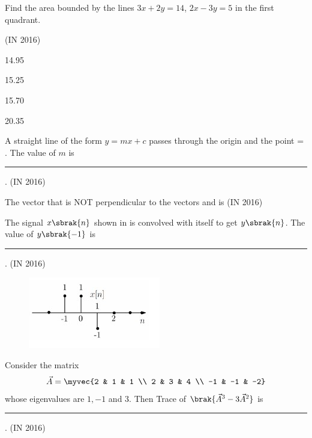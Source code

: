 \item Find the area bounded by the lines $3x+2y=14$, $2x-3y=5$ in the first quadrant.

\hfill{(IN 2016)}
\begin{enumerate}
\begin{multicols}{4}
\item 14.95
\item 15.25
\item 15.70
\item 20.35
\end{multicols}
\end{enumerate}
\item A straight line of the form $y = mx + c$ passes through the origin and the point  = . The value of $m$ is \rule{2cm}{0.4pt}.
\hfill{(IN 2016)}
\item The vector that is NOT perpendicular to the vectors  and  is 
\hfill{(IN 2016)}
\begin{enumerate}
\begin{multicols}{4}
\item {}
\item {}
\item {}
\item {}
\end{multicols}
\end{enumerate}
\item The signal $x\sbrak{n}$ shown in  is convolved with itself to get $y\sbrak{n}$. The value of $y\sbrak{-1}$ is \rule{2cm}{0.4pt}.
\hfill{(IN 2016)}
\begin{figure}[H]
\centering
\includegraphics[width=0.5\columnwidth]{GATE/2016/IN/figs/z4.jpg}
\caption{}
\label{fig:z4}
\end{figure}
\item Consider the matrix
\begin{align*}
\vec{A} = \myvec{2 & 1 & 1 \\ 2 & 3 & 4 \\ -1 & -1 & -2}
\end{align*}
whose eigenvalues are $1, -1$ and $3$. Then Trace of $\brak{\vec{A}^3 - 3\vec{A}^2}$ is \rule{1cm}{0.01pt}.
\hfill{(IN 2016)}

